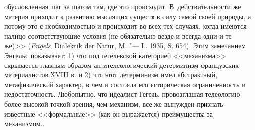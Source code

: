 {{{обусловленная шаг за шагом там, где это происходит. В~действительности же
материя приходит к развитию мыслящих существ в силу самой своей природы, а
потому это с необходимостью и происходит во всех тех случаях, когда имеются
налицо соответствующие условия (не обязательно везде и всегда одни и те
же)>> ({\em Engels},
Dialektik der Natur, M. "--- L. 1935, S. 654). Этим замечанием
Энгельс показывает: 1) что под гегелевской категорией <<механизма>>
скрывается главным образом антителеологический детерминизм французских
материалистов XVIII в. и 2) что этот детерминизм имел абстрактный,
метафизический характер, в чем и состояла его историческая ограниченность и
недостаточность. Любопытно, что идеалист Гегель, провозглашая телеологию
более высокой точкой зрения, чем механизм, все же вынужден признать
известные <<формальные>> (как он выражается) преимущества за
механизмом.\label{bkm:bm83}}.

}}
